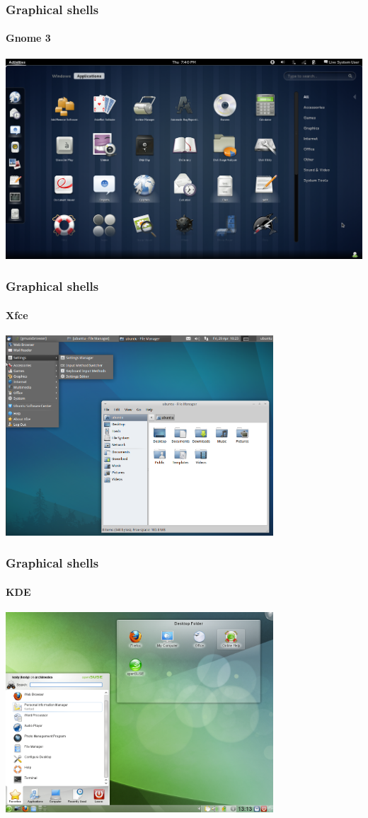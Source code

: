 \documentclass[t,table,usenames,dvipsnames]{beamer}
\begin{document}
\begin{frame}
	\frametitle{Graphical shells}
	\framesubtitle{Gnome 3}
	\includegraphics[width=\textwidth]{gnome3.png}
\end{frame}


\begin{frame}
	\frametitle{Graphical shells}
	\framesubtitle{Xfce}
	\centering
	\includegraphics[width=0.75\textwidth]{xfce.png}
\end{frame}


\begin{frame}
	\frametitle{Graphical shells}
	\framesubtitle{KDE}
	\centering
	\includegraphics[width=0.75\textwidth]{kde.png}
\end{frame}
\end{document}
